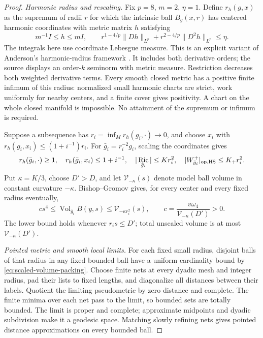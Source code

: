 \documentclass[11pt]{article}
\numberwithin{equation}{section}
\theoremstyle{definition}
\theoremstyle{remark}
\DeclareMathOperator{\Ric}{Ric}
\DeclareMathOperator{\Vol}{Vol}
\begin{document}
\begin{proof}
\emph{Harmonic radius and rescaling.}
Fix \(p=8\), \(m=2\), \(\eta=1\). Define \(r_h(g,x)\) as
the supremum of radii \(r\) for which the intrinsic ball
\(B_g(x,r)\) has centered harmonic coordinates with metric
matrix \(h\) satisfying
\begin{equation}\label{eq:explicit-harmonic-radius}
 m^{-1}I\le h\le mI,\qquad
 r^{1-4/p}\|Dh\|_{L^p}+r^{2-4/p}\|D^2h\|_{L^p}\le\eta .
\end{equation}
The integrals here use coordinate Lebesgue measure. This is an
explicit variant of Anderson's harmonic-radius framework
\cite[Definition 2.1, (2.1)--(2.2), p.~4, and proof of Theorem 2.2, pp.~5--6]{AndersonCheegerGromovAuthorSurvey}.
It includes both derivative orders; the source displays an
order-\(k\) seminorm with metric measure. Restriction decreases
both weighted derivative terms. Every smooth closed metric has
a positive finite infimum of this radius: normalized small
harmonic charts are strict, work uniformly for nearby centers,
and a finite cover gives positivity. A chart on the whole
closed manifold is impossible. No attainment of the supremum
or infimum is required.

Suppose a subsequence has \(r_i=\inf_M r_h(g_i,\cdot)\to0\),
and choose \(x_i\) with \(r_h(g_i,x_i)\le(1+i^{-1})r_i\).
For \(\bar g_i=r_i^{-2}g_i\), scaling the coordinates gives
\[
 r_h(\bar g_i,\cdot)\ge1,\quad
 r_h(\bar g_i,x_i)\le1+i^{-1},\quad
 |\Ric_{\bar g_i}|\le Kr_i^2,\quad
 |W^+_{\bar g_i}|_{\rm op,HS}\le K_+r_i^2.
\]
Put \(\kappa=K/3\), choose \(D'>D\), and let
\(\mathcal V_{-\kappa}(s)\) denote model ball volume in
constant curvature \(-\kappa\). Bishop--Gromov gives,
for every center and every fixed radius eventually,
\begin{equation}\label{eq:scaled-volume-packing}
 c s^4\le\Vol_{\bar g_i}B(y,s)
             \le\mathcal V_{-\kappa r_i^2}(s),\qquad
 c=\frac{v\omega_4}{\mathcal V_{-\kappa}(D')}>0.
\end{equation}
The lower bound holds whenever \(r_i s\le D'\); total
unscaled volume is at most \(\mathcal V_{-\kappa}(D')\).

\emph{Pointed metric and smooth local limits.}
For each fixed small radius, disjoint balls of that radius
in any fixed bounded ball have a uniform cardinality bound
by \eqref{eq:scaled-volume-packing}.
Choose finite nets at every dyadic mesh and integer radius,
pad their lists to fixed lengths, and diagonalize all distances
between their labels. Quotient the limiting pseudometric by
zero distance and complete. The finite minima over each net
pass to the limit, so bounded sets are totally bounded.
The limit is proper and complete; approximate midpoints and
dyadic subdivision make it a geodesic space. Matching slowly
refining nets gives pointed distance approximations on every
bounded ball.


\end{proof}
\end{document}
